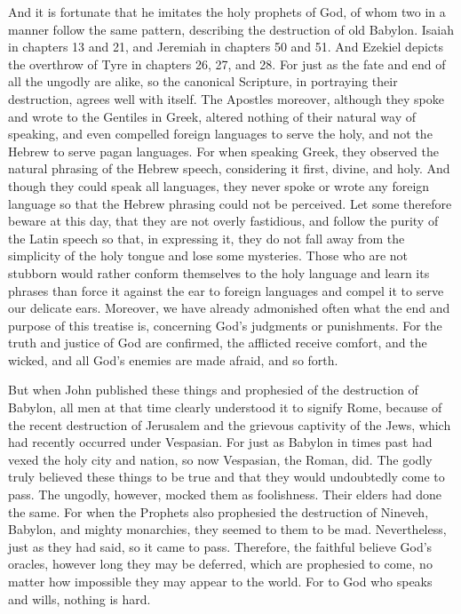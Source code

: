 And it is fortunate that he imitates the holy prophets of God, of whom two in a manner follow the same pattern, describing the destruction of old Babylon. Isaiah in chapters 13 and 21, and Jeremiah in chapters 50 and 51. And Ezekiel depicts the overthrow of Tyre in chapters 26, 27, and 28. For just as the fate and end of all the ungodly are alike, so the canonical Scripture, in portraying their destruction, agrees well with itself. The Apostles moreover, although they spoke and wrote to the Gentiles in Greek, altered nothing of their natural way of speaking, and even compelled foreign languages to serve the holy, and not the Hebrew to serve pagan languages. For when speaking Greek, they observed the natural phrasing of the Hebrew speech, considering it first, divine, and holy. And though they could speak all languages, they never spoke or wrote any foreign language so that the Hebrew phrasing could not be perceived. Let some therefore beware at this day, that they are not overly fastidious, and follow the purity of the Latin speech so that, in expressing it, they do not fall away from the simplicity of the holy tongue and lose some mysteries. Those who are not stubborn would rather conform themselves to the holy language and learn its phrases than force it against the ear to foreign languages and compel it to serve our delicate ears. Moreover, we have already admonished often what the end and purpose of this treatise is, concerning God’s judgments or punishments. For the truth and justice of God are confirmed, the afflicted receive comfort, and the wicked, and all God’s enemies are made afraid, and so forth.

But when John published these things and prophesied of the destruction of Babylon, all men at that time clearly understood it to signify Rome, because of the recent destruction of Jerusalem and the grievous captivity of the Jews, which had recently occurred under Vespasian. For just as Babylon in times past had vexed the holy city and nation, so now Vespasian, the Roman, did. The godly truly believed these things to be true and that they would undoubtedly come to pass. The ungodly, however, mocked them as foolishness. Their elders had done the same. For when the Prophets also prophesied the destruction of Nineveh, Babylon, and mighty monarchies, they seemed to them to be mad. Nevertheless, just as they had said, so it came to pass. Therefore, the faithful believe God’s oracles, however long they may be deferred, which are prophesied to come, no matter how impossible they may appear to the world. For to God who speaks and wills, nothing is hard.


